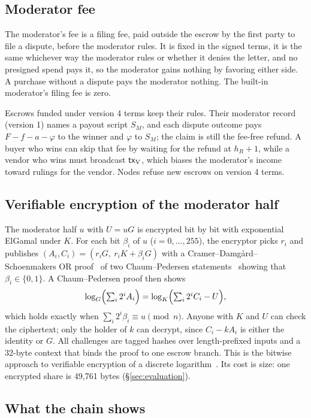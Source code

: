 \subsection{Moderator fee}
\label{sec:modfee}
The moderator's fee is a filing fee, paid outside the escrow by the first party to file a dispute, before the moderator rules. It is fixed in the signed terms, it is the same whichever way the moderator rules or whether it denies the letter, and no presigned spend pays it, so the moderator gains nothing by favoring either side. A purchase without a dispute pays the moderator nothing. The built-in moderator's filing fee is zero.

Escrows funded under version 4 terms keep their rules. Their moderator record (version 1) names a payout script $S_M$, and each dispute outcome pays $F-f-a-\varphi$ to the winner and $\varphi$ to $S_M$; the claim is still the fee-free refund. A buyer who wins can skip that fee by waiting for the refund at $h_R+1$, while a vendor who wins must broadcast $\mathsf{tx}_{\mathrm{V}}$, which biases the moderator's income toward rulings for the vendor. Nodes refuse new escrows on version 4 terms.

\subsection{Verifiable encryption of the moderator half}
\label{sec:vencrypt}

The moderator half $u$ with $U=uG$ is encrypted bit by bit with exponential ElGamal under $K$. For each bit $\beta_i$ of $u$ ($i=0,\dots,255$), the encryptor picks $r_i$ and publishes $(A_i,C_i)=(r_iG,\ r_iK+\beta_iG)$ with a Cramer--Damg{\aa}rd--Schoenmakers OR proof~\citep{cramer1994} of two Chaum--Pedersen statements~\citep{chaum1992} showing that $\beta_i\in\{0,1\}$. A Chaum--Pedersen proof then shows
\[
  \log_G\Bigl(\textstyle\sum_i 2^iA_i\Bigr)=\log_K\Bigl(\textstyle\sum_i 2^iC_i-U\Bigr),
\]
which holds exactly when $\sum_i 2^i\beta_i\equiv u \pmod n$. Anyone with $K$ and $U$ can check the ciphertext; only the holder of $k$ can decrypt, since $C_i-kA_i$ is either the identity or $G$. All challenges are tagged hashes over length-prefixed inputs and a 32-byte context that binds the proof to one escrow branch. This is the bitwise approach to verifiable encryption of a discrete logarithm~\citep{stadler1996pvss,camenisch2003}. Its cost is size: one encrypted share is 49{,}761 bytes (\S\ref{sec:evaluation}).

\subsection{What the chain shows}
\label{sec:escrow-privacy}

